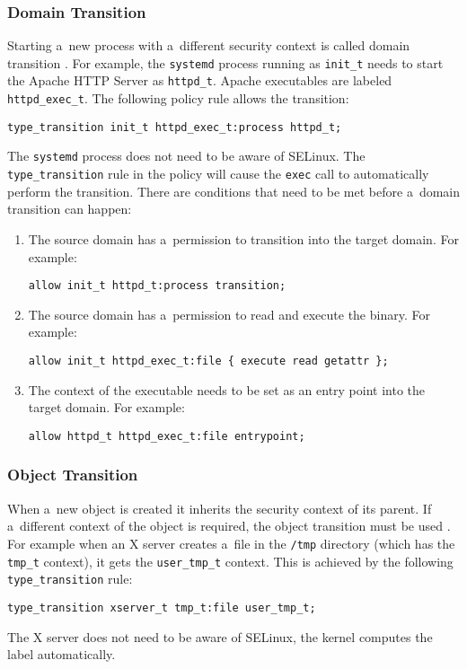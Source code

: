 \subsubsection{Domain Transition}
Starting a~new process with a~different security context is called domain
transition \cite[pp.~43--47]{tsn}. For example, the \texttt{systemd} process
running as \texttt{init\_t} needs to start the Apache HTTP Server as
\texttt{httpd\_t}. Apache executables are labeled \texttt{httpd\_exec\_t}. The
following policy rule allows the transition:
\begin{lstlisting}[language=te]
type_transition init_t httpd_exec_t:process httpd_t;
\end{lstlisting}
The \texttt{systemd} process does not need to be aware of SELinux. The
\texttt{type\_transition} rule in the policy will cause the \texttt{exec} call
to automatically perform the transition. There are conditions that need to be
met before a~domain transition can happen:
\begin{enumerate}
    \item The source domain has a~permission to transition into the target
        domain. For example:
\begin{lstlisting}[language=te]
allow init_t httpd_t:process transition;
\end{lstlisting}
    \item The source domain has a~permission to read and execute the binary. For
        example:
\begin{lstlisting}[language=te]
allow init_t httpd_exec_t:file { execute read getattr };
\end{lstlisting}
    \item The context of the executable needs to be set as an entry point into
        the target domain. For example:
\begin{lstlisting}[language=te]
allow httpd_t httpd_exec_t:file entrypoint;
\end{lstlisting}
\end{enumerate}

\subsubsection{Object Transition}
When a~new object is created it inherits the security context of its parent. If
a~different context of the object is required, the object transition must be
used \cite[pp.~47--48]{tsn}. For example when an X server creates a~file in the
\texttt{/tmp} directory (which has the \texttt{tmp\_t} context), it gets the 
\texttt{user\_tmp\_t} context. This is achieved by the following
\texttt{type\_transition} rule:
\begin{lstlisting}[language=te]
type_transition xserver_t tmp_t:file user_tmp_t;
\end{lstlisting}
The X server does not need to be aware of SELinux, the kernel computes the label
automatically.

